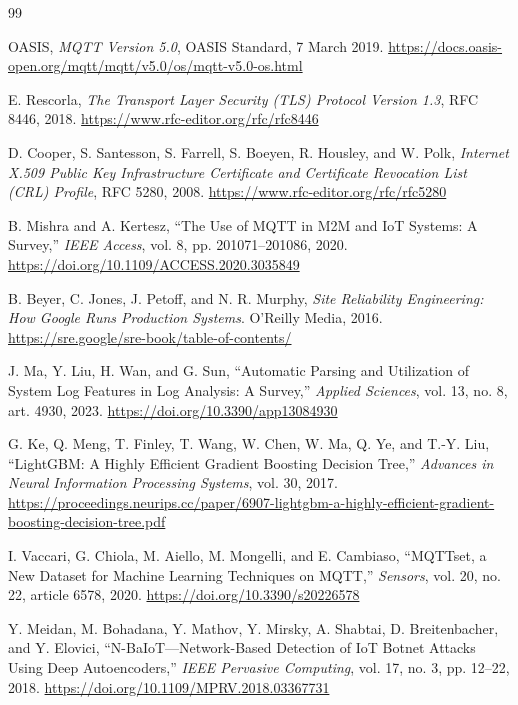 \documentclass[12pt,a4paper]{report}
\begin{document}
\begin{thebibliography}{99}

OASIS,
\emph{MQTT Version 5.0},
OASIS Standard, 7 March 2019.
\url{https://docs.oasis-open.org/mqtt/mqtt/v5.0/os/mqtt-v5.0-os.html}

E. Rescorla,
\emph{The Transport Layer Security (TLS) Protocol Version 1.3},
RFC 8446, 2018.
\url{https://www.rfc-editor.org/rfc/rfc8446}

D. Cooper, S. Santesson, S. Farrell, S. Boeyen,
R. Housley, and W. Polk,
\emph{Internet X.509 Public Key Infrastructure Certificate
and Certificate Revocation List (CRL) Profile},
RFC 5280, 2008.
\url{https://www.rfc-editor.org/rfc/rfc5280}

B. Mishra and A. Kertesz,
``The Use of MQTT in M2M and IoT Systems: A Survey,''
\emph{IEEE Access}, vol. 8, pp. 201071--201086, 2020.
\url{https://doi.org/10.1109/ACCESS.2020.3035849}

B. Beyer, C. Jones, J. Petoff, and N. R. Murphy,
\emph{Site Reliability Engineering: How Google Runs
Production Systems}.
O'Reilly Media, 2016.
\url{https://sre.google/sre-book/table-of-contents/}

J. Ma, Y. Liu, H. Wan, and G. Sun,
``Automatic Parsing and Utilization of System Log Features
in Log Analysis: A Survey,''
\emph{Applied Sciences}, vol. 13, no. 8, art. 4930, 2023.
\url{https://doi.org/10.3390/app13084930}

G. Ke, Q. Meng, T. Finley, T. Wang, W. Chen,
W. Ma, Q. Ye, and T.-Y. Liu,
``LightGBM: A Highly Efficient Gradient Boosting Decision Tree,''
\emph{Advances in Neural Information Processing Systems},
vol. 30, 2017.
\url{https://proceedings.neurips.cc/paper/6907-lightgbm-a-highly-efficient-gradient-boosting-decision-tree.pdf}

I. Vaccari, G. Chiola, M. Aiello, M. Mongelli,
and E. Cambiaso,
``MQTTset, a New Dataset for Machine Learning
Techniques on MQTT,''
\emph{Sensors}, vol. 20, no. 22,
article 6578, 2020.
\url{https://doi.org/10.3390/s20226578}

Y. Meidan, M. Bohadana, Y. Mathov, Y. Mirsky,
A. Shabtai, D. Breitenbacher, and Y. Elovici,
``N-BaIoT---Network-Based Detection of IoT Botnet Attacks
Using Deep Autoencoders,''
\emph{IEEE Pervasive Computing}, vol. 17, no. 3,
pp. 12--22, 2018.
\url{https://doi.org/10.1109/MPRV.2018.03367731}

\end{thebibliography}
\end{document}
